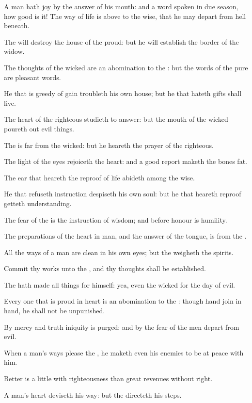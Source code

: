 \Verse A man hath joy by the answer of his mouth: and a word spoken in due season, how good is it!  \Verse The way of life is above to the wise, that he may depart from hell beneath.

\Verse The \LORD will destroy the house of the proud: but he will establish the border of the widow.

\Verse The thoughts of the wicked are an abomination to the \LORD: but the words of the pure are pleasant words.

\Verse He that is greedy of gain troubleth his own house; but he that hateth gifts shall live.

\Verse The heart of the righteous studieth to answer: but the mouth of the wicked poureth out evil things.

\Verse The \LORD is far from the wicked: but he heareth the prayer of the righteous.

\Verse The light of the eyes rejoiceth the heart: and a good report maketh the bones fat.

\Verse The ear that heareth the reproof of life abideth among the wise.

\Verse He that refuseth instruction despiseth his own soul: but he that heareth reproof getteth understanding.

\Verse The fear of the \LORD is the instruction of wisdom; and before honour is humility.


\Chapter
\Verse The preparations of the heart in man, and the answer of the tongue, is from the \LORD.

\Verse All the ways of a man are clean in his own eyes; but the \LORD weigheth the spirits.

\Verse Commit thy works unto the \LORD, and thy thoughts shall be established.

\Verse The \LORD hath made all things for himself: yea, even the wicked for the day of evil.

\Verse Every one that is proud in heart is an abomination to the \LORD: though hand join in hand, he shall not be unpunished.

\Verse By mercy and truth iniquity is purged: and by the fear of the \LORD men depart from evil.

\Verse When a man's ways please the \LORD, he maketh even his enemies to be at peace with him.

\Verse Better is a little with righteousness than great revenues without right.

\Verse A man's heart deviseth his way: but the \LORD directeth his steps.

